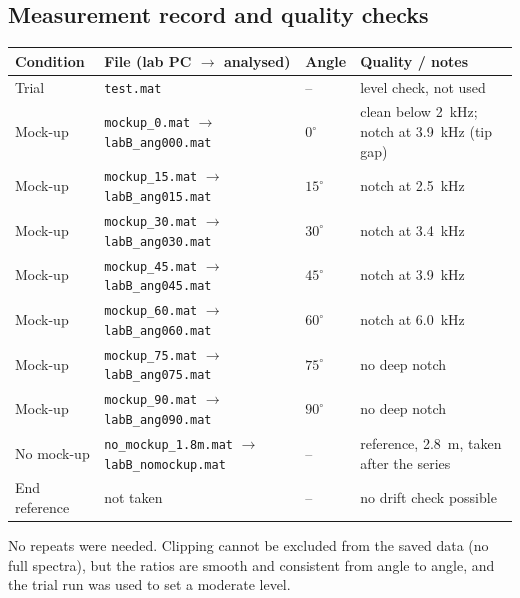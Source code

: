 \documentclass[a4paper,10pt]{article}
\newcommand{\file}[1]{\nolinkurl{#1}}
\begin{document}
\subsection{Measurement record and quality checks}
\par\smallskip
\begin{tabularx}{\linewidth}{@{}lXlX@{}}\toprule
Condition & File (lab PC $\to$ analysed) & Angle & Quality / notes \\\midrule
Trial & \file{test.mat} & -- & level check, not used \\
Mock-up & \file{mockup_0.mat} $\to$ \file{labB_ang000.mat} & $0^\circ$ & clean below \SI{2}{kHz}; notch at \SI{3.9}{kHz} (tip gap) \\
Mock-up & \file{mockup_15.mat} $\to$ \file{labB_ang015.mat} & $15^\circ$ & notch at \SI{2.5}{kHz} \\
Mock-up & \file{mockup_30.mat} $\to$ \file{labB_ang030.mat} & $30^\circ$ & notch at \SI{3.4}{kHz} \\
Mock-up & \file{mockup_45.mat} $\to$ \file{labB_ang045.mat} & $45^\circ$ & notch at \SI{3.9}{kHz} \\
Mock-up & \file{mockup_60.mat} $\to$ \file{labB_ang060.mat} & $60^\circ$ & notch at \SI{6.0}{kHz} \\
Mock-up & \file{mockup_75.mat} $\to$ \file{labB_ang075.mat} & $75^\circ$ & no deep notch \\
Mock-up & \file{mockup_90.mat} $\to$ \file{labB_ang090.mat} & $90^\circ$ & no deep notch \\
No mock-up & \file{no_mockup_1.8m.mat} $\to$ \file{labB_nomockup.mat} & -- & reference, \SI{2.8}{m}, taken after the series \\
End reference & not taken & -- & no drift check possible \\\bottomrule
\end{tabularx}\par\smallskip
No repeats were needed. Clipping cannot be excluded from the saved data (no full
spectra), but the ratios are smooth and consistent from angle to angle, and the trial
run was used to set a moderate level.
\end{document}
